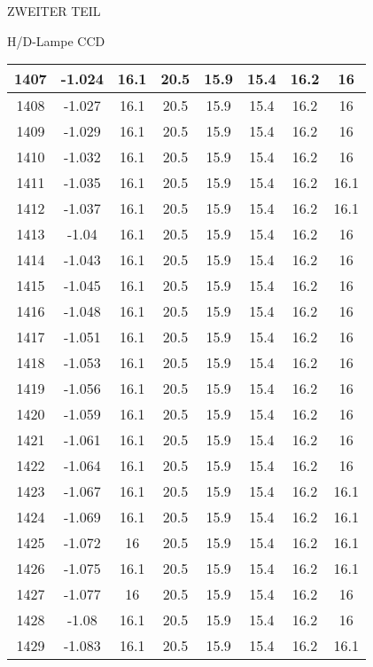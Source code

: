 \begin{appendix}
\begin{chapter}{ZWEITER TEIL}
\begin{section}{H/D-Lampe CCD}
\begin{scriptsize}
\begin{longtable}[htbp]{|c|c|c|c|c|c|c|c|}
            1407 & -1.024 & 16.1 & 20.5 & 15.9 & 15.4 & 16.2 & 16 \\ \hline
            1408 & -1.027 & 16.1 & 20.5 & 15.9 & 15.4 & 16.2 & 16 \\ \hline
            1409 & -1.029 & 16.1 & 20.5 & 15.9 & 15.4 & 16.2 & 16 \\ \hline
            1410 & -1.032 & 16.1 & 20.5 & 15.9 & 15.4 & 16.2 & 16 \\ \hline
            1411 & -1.035 & 16.1 & 20.5 & 15.9 & 15.4 & 16.2 & 16.1 \\ \hline
            1412 & -1.037 & 16.1 & 20.5 & 15.9 & 15.4 & 16.2 & 16.1 \\ \hline
            1413 & -1.04 & 16.1 & 20.5 & 15.9 & 15.4 & 16.2 & 16 \\ \hline
            1414 & -1.043 & 16.1 & 20.5 & 15.9 & 15.4 & 16.2 & 16 \\ \hline
            1415 & -1.045 & 16.1 & 20.5 & 15.9 & 15.4 & 16.2 & 16 \\ \hline
            1416 & -1.048 & 16.1 & 20.5 & 15.9 & 15.4 & 16.2 & 16 \\ \hline
            1417 & -1.051 & 16.1 & 20.5 & 15.9 & 15.4 & 16.2 & 16 \\ \hline
            1418 & -1.053 & 16.1 & 20.5 & 15.9 & 15.4 & 16.2 & 16 \\ \hline
            1419 & -1.056 & 16.1 & 20.5 & 15.9 & 15.4 & 16.2 & 16 \\ \hline
            1420 & -1.059 & 16.1 & 20.5 & 15.9 & 15.4 & 16.2 & 16 \\ \hline
            1421 & -1.061 & 16.1 & 20.5 & 15.9 & 15.4 & 16.2 & 16 \\ \hline
            1422 & -1.064 & 16.1 & 20.5 & 15.9 & 15.4 & 16.2 & 16 \\ \hline
            1423 & -1.067 & 16.1 & 20.5 & 15.9 & 15.4 & 16.2 & 16.1 \\ \hline
            1424 & -1.069 & 16.1 & 20.5 & 15.9 & 15.4 & 16.2 & 16.1 \\ \hline
            1425 & -1.072 & 16 & 20.5 & 15.9 & 15.4 & 16.2 & 16.1 \\ \hline
            1426 & -1.075 & 16.1 & 20.5 & 15.9 & 15.4 & 16.2 & 16.1 \\ \hline
            1427 & -1.077 & 16 & 20.5 & 15.9 & 15.4 & 16.2 & 16 \\ \hline
            1428 & -1.08 & 16.1 & 20.5 & 15.9 & 15.4 & 16.2 & 16 \\ \hline
            1429 & -1.083 & 16.1 & 20.5 & 15.9 & 15.4 & 16.2 & 16.1 \\ \hline

\end{longtable}
\end{scriptsize}
\end{section}
\end{chapter}
\end{appendix}
